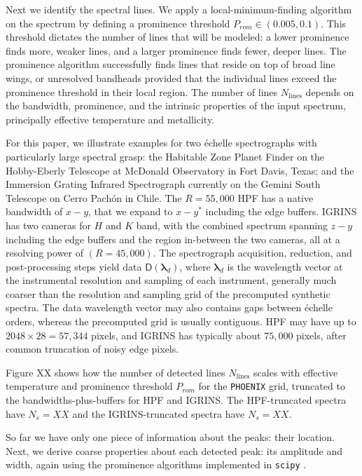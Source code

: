 \documentclass[modern]{aastex631}
\begin{document}
Next we identify the spectral lines.  We apply a local-minimum-finding algorithm on the spectrum by defining a prominence threshold $P_{rom} \in (0.005, 0.1)$.  This threshold dictates the number of lines that will be modeled: a lower prominence finds more, weaker lines, and a larger prominence finds fewer, deeper lines.  The prominence algorithm successfully finds lines that reside on top of broad line wings, or unresolved bandheads provided that the individual lines exceed the prominence threshold in their local region.  The number of lines $N_{\mathrm{lines}}$ depends on the bandwidth, prominence, and the intrinsic properties of the input spectrum, principally effective temperature and metallicity.

For this paper, we illustrate examples for two \'echelle spectrographs with particularly large spectral grasp: the Habitable Zone Planet Finder \citep[HPF,][]{2014SPIE.9147E..1GM} on the Hobby-Eberly Telescope at McDonald Observatory in Fort Davis, Texas; and the Immersion Grating Infrared Spectrograph \citep[IGRINS,][]{park14}
currently on the Gemini South Telescope on Cerro Pach\'on in Chile.  The $R=55,000$ HPF has a native bandwidth of $x-y$, that we expand to $x-y^*$ including the edge buffers.  IGRINS has two cameras for $H$ and $K$ band, with the combined spectrum spanning $z-y$ including the edge buffers and the region in-between the two cameras, all at a resolving power of $(R=45,000)$.  The spectrograph acquisition, reduction, and post-processing steps yield data $\mathsf{D}(\bm{\lambda}_{d})$, where $\bm{\lambda}_{d}$ is the wavelength vector at the instrumental resolution and sampling of each instrument, generally much coarser than the resolution and sampling grid of the precomputed synthetic spectra.  The data wavelength vector may also contains gaps between \'echelle orders, whereas the precomputed grid is usually contiguous.  HPF may have up to $2048\times28=57,344$ pixels, and IGRINS has typically about $75,000$ pixels, after common truncation of noisy edge pixels.

Figure XX shows how the number of detected lines $N_{\mathrm{lines}}$ scales with effective temperature and prominence threshold $P_{rom}$ for the \texttt{PHOENIX} grid, truncated to the bandwidths-plus-buffers for HPF and IGRINS.  The HPF-truncated spectra have $N_s=XX$ and the IGRINS-truncated spectra have $N_s=XX$.

So far we have only one piece of information about the peaks: their location.  Next, we derive coarse properties about each detected peak: its amplitude and width, again using the prominence algorithms implemented in \texttt{scipy} \citep{2020SciPy-NMeth}.
\end{document}
